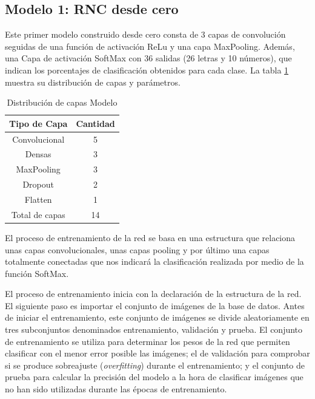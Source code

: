 

\subsection{Modelo 1: RNC desde cero}\label{sec:modelo1}
Este primer modelo construido desde cero consta de 3 capas de convolución seguidas de una función de activación ReLu y una capa MaxPooling. Además, una Capa de activación SoftMax con 36 salidas (26 letras y 10 números), que indican los porcentajes de clasificación obtenidos para cada clase. La tabla \ref{tab:Distribución de capas RCN} muestra su distribución de capas y parámetros.

\begin{table}[H]
    \centering
    \begin{tabular}{||c|c||}
      \hline \hline
      \textbf{Tipo de Capa} & \textbf{Cantidad}\\
      \hline \hline
      Convolucional & 5 \\
      \hline
      Densas & 3 \\
      \hline
      MaxPooling & 3 \\
      \hline
      Dropout & 2\\
      \hline
      Flatten & 1 \\
      \hline
      Total de capas & 14  \\
      \hline
      \hline
    \end{tabular}
    \caption{Distribución de capas Modelo}
    \label{tab:Distribución de capas RCN}
\end{table}

El proceso de entrenamiento de la red se basa en una estructura que relaciona unas capas convolucionales, unas capas pooling y por último una capas totalmente conectadas que nos indicará la clasificación realizada por medio de la función SoftMax.

El proceso de entrenamiento inicia con la declaración de la estructura de la red. El siguiente paso es importar el conjunto de imágenes de la base de datos. Antes de iniciar el entrenamiento, este conjunto de imágenes se divide aleatoriamente en tres subconjuntos denominados entrenamiento, validación y prueba. El conjunto de entrenamiento se utiliza para determinar los pesos de la red que permiten clasificar con el menor error posible las imágenes; el de validación para comprobar si se produce sobreajuste (\textit{overfitting}) durante el entrenamiento; y el conjunto de prueba para calcular la precisión del modelo a la hora de clasificar imágenes que no han sido utilizadas durante las épocas de entrenamiento.

